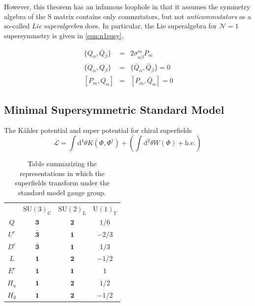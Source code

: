 However, this theorem has an infamous loophole in that it assumes the
symmetry algebra of the S matrix contains only commutators, but not
\emph{anticommutators} as a so-called \emph{Lie superalgrebra}
does. In particular, the Lie superalgebra for $\mathcal N=1$
supersymmetry is given in \ref{eqn:n1susy},

\begin{eqnarray}
~\{ Q_{\alpha},\bar Q_{\dot{\beta}}\} &=& 2\sigma^m_{\alpha\dot\beta} P_m \nonumber\\
~\{ Q_{\alpha},Q_{\beta}\} &=& \{ \bar Q_{\dot\alpha},\bar Q_{\dot\beta}\} = 0\nonumber\\
~[ P_m, Q_{\alpha}] &=& [P_m,\bar Q_{\dot\alpha}] = 0
\label{eqn:n1susy}
\end{eqnarray}

\subsection{Minimal Supersymmetric Standard Model}
The K\"{a}hler potential and super potential for chiral superfields
\begin{equation}
\mathcal L = \int \mathrm{d}^4\theta K(\Phi,\Phi^{\dagger}) + \left (\int
 \mathrm{d}^2\theta W(\Phi) + \mathrm{h.c.} \right)
\label{eqn:mssmlag}
\end{equation}

\begin{table}
\centering
\begin{tabular}{c|ccc}
&$\mathrm{SU(3)}_{\mathrm{C}}$&$\mathrm{SU(2)}_{\mathrm{L}}$&$\mathrm{U(1)}_Y$ \\
$Q$ & $\mathbf{3}$ & $\mathbf{2}$ & $1/6$\\
$U^c$ & $\mathbf{\bar 3}$ & $\mathbf{1}$ & $-2/3$\\
$D^c$ & $\mathbf{\bar 3}$ & $\mathbf{1}$ & $1/3$\\
$L$ & $\mathbf{1}$ & $\mathbf{2}$ & $-1/2$\\
$E^c$ & $\mathbf{1}$ & $\mathbf{1}$ & $1$\\\hline
$H_u$ & $\mathbf{1}$ & $\mathbf{2}$ & $1/2$\\
$H_d$ & $\mathbf{1}$ & $\mathbf{2}$ & $-1/2$
\end{tabular}
\caption{\label{tab:representations} Table summarizing the
    representations in which the superfields transform under the standard
    model gauge group.}
\end{table}

